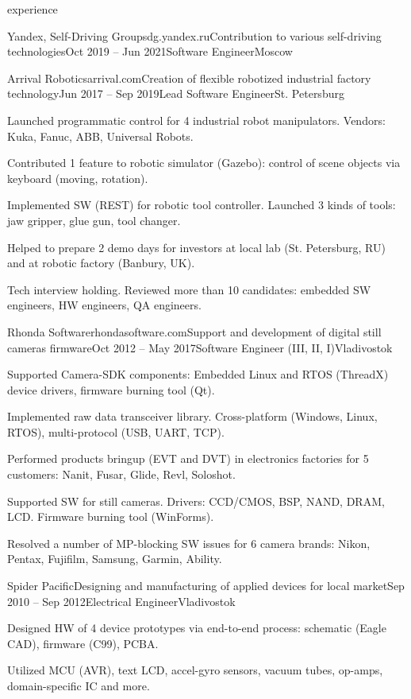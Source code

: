 \documentclass{Vladimir.Ivanov.CV}
\begin{document}
\begin{rSection}{experience}
\begin{rCompany}{Yandex, Self-Driving Group}{sdg.yandex.ru}{Contribution to various self-driving technologies}{Oct 2019 -- Jun 2021}{Software Engineer}{Moscow}
\end{rCompany}
\begin{rCompany}{Arrival Robotics}{arrival.com}{Creation of flexible robotized industrial factory technology}{Jun 2017 -- Sep 2019}{Lead Software Engineer}{St. Petersburg}

\item Launched programmatic control for 4 industrial robot manipulators. Vendors: Kuka, Fanuc, ABB, Universal Robots.
\item Contributed 1 feature to robotic simulator (Gazebo): control of scene objects via keyboard (moving, rotation).
\item Implemented SW (REST) for robotic tool controller. Launched 3 kinds of tools: jaw gripper, glue gun, tool changer.
\item Helped to prepare 2 demo days for investors at local lab (St. Petersburg, RU) and at robotic factory (Banbury, UK).
\item Tech interview holding. Reviewed more than 10 candidates: embedded SW engineers, HW engineers, QA engineers.

\end{rCompany}
\begin{rCompany}{Rhonda Software}{rhondasoftware.com}{Support and development of digital still cameras firmware}{Oct 2012 -- May 2017}{Software Engineer (III, II, I)}{Vladivostok}

\item Supported Camera-SDK components: Embedded Linux and RTOS (ThreadX) device drivers, firmware burning tool (Qt).
\item Implemented raw data transceiver library. Cross-platform (Windows, Linux, RTOS), multi-protocol (USB, UART, TCP).
\item Performed products bringup (EVT and DVT) in electronics factories for 5 customers: Nanit, Fusar, Glide, Revl, Soloshot.
\item Supported SW for still cameras. Drivers: CCD/CMOS, BSP, NAND, DRAM, LCD. Firmware burning tool (WinForms).
\item Resolved a number of MP-blocking SW issues for 6 camera brands: Nikon, Pentax, Fujifilm, Samsung, Garmin, Ability.

\end{rCompany}
\begin{rCompany}{Spider Pacific}{}{Designing and manufacturing of applied devices for local market}{Sep 2010 -- Sep 2012}{Electrical Engineer}{Vladivostok}

\item Designed HW of 4 device prototypes via end-to-end process: schematic (Eagle CAD), firmware (C99), PCBA.
\item Utilized MCU (AVR), text LCD, accel-gyro sensors, vacuum tubes, op-amps, domain-specific IC and more.

\end{rCompany}
\end{rSection}
\end{document}

